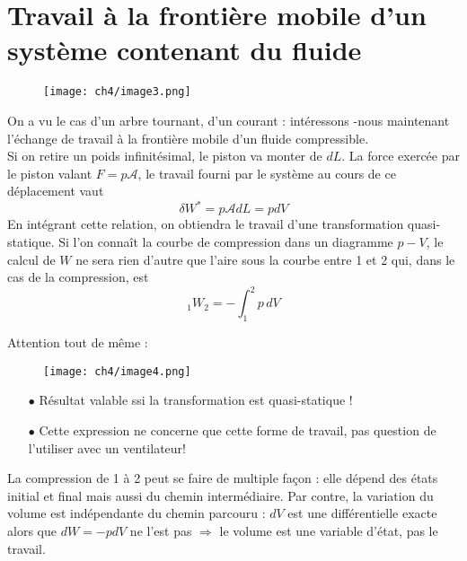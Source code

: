 \section{Travail à la frontière mobile d'un système contenant du 
fluide}
\begin{wrapfigure}[7]{r}{4.7cm}
	\vspace{-7mm}
	\texttt{[image: ch4/image3.png]}
\end{wrapfigure}
On a vu le cas d'un arbre tournant, d'un courant : intéressons 
-nous maintenant l'échange de travail à la frontière mobile d'un 
fluide compressible.\\
Si on retire un poids infinitésimal, le piston va monter de $dL$. 
La force exercée par le piston valant $F = p\mathcal{A}$, le 
travail fourni par le système au cours de ce déplacement vaut
\begin{equation}
	\delta W^* = p\mathcal{A}dL = pdV
\end{equation}
En intégrant cette relation, on obtiendra le travail d'une 
transformation quasi-statique. Si l'on connaît la courbe de 
compression dans un diagramme $p-V$, le calcul de $W$ ne sera 
rien d'autre que l'aire sous la courbe entre 1 et 2 qui, dans le cas de la compression, est 
\begin{equation}
	_1W_2 = -\int _1^2 p \, dV
\end{equation}

Attention tout de même :\\
\begin{wrapfigure}[10]{l}{4.7cm}
	\vspace{-7mm}
	\texttt{[image: ch4/image4.png]}
\end{wrapfigure}
\vspace{-1cm}
\begin{itemize}
	\item[$\bullet$] Résultat valable ssi la transformation est 
	      quasi-statique !
	\item[$\bullet$] Cette expression ne concerne que cette forme de
	      travail, pas question de l'utiliser avec un ventilateur!
\end{itemize}
La compression de 1 à 2 peut se faire de multiple façon : elle 
dépend des états initial et final mais aussi du chemin 
intermédiaire. Par contre, la variation du volume est indépendante 
du chemin parcouru : $dV$ est une différentielle exacte alors 
que $dW = -pdV$ ne l'est pas $\Longrightarrow$ le volume est 
une variable d'état, pas le travail.\\\\\\


